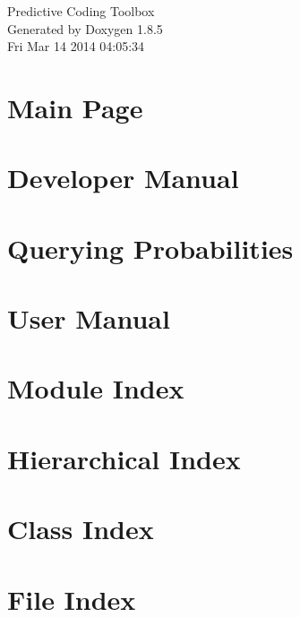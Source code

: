 \documentclass[twoside]{book}
\newcommand{\clearemptydoublepage}{%
  \newpage{\pagestyle{empty}\cleardoublepage}%
}
\begin{document}
\hypersetup{pageanchor=false}
\begin{titlepage}
\vspace*{7cm}
\begin{center}%
{\Large Predictive Coding Toolbox }\\
\vspace*{1cm}
{\large Generated by Doxygen 1.8.5}\\
\vspace*{0.5cm}
{\small Fri Mar 14 2014 04:05:34}\\
\end{center}
\end{titlepage}
\clearemptydoublepage
\tableofcontents
\clearemptydoublepage
{}
\hypersetup{pageanchor=true}

\chapter{Main Page}
\label{index}\hypertarget{index}{}
\chapter{Developer Manual}
\label{developer}
\hypertarget{developer}{}

\chapter{Querying Probabilities}
\label{query}
\hypertarget{query}{}

\chapter{User Manual}
\label{manual}
\hypertarget{manual}{}

\chapter{Module Index}

\chapter{Hierarchical Index}

\chapter{Class Index}

\chapter{File Index}

\end{document}

